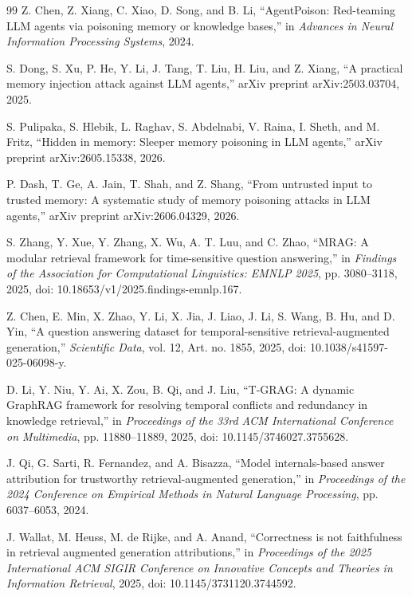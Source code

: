 \begin{thebibliography}{99}
Z. Chen, Z. Xiang, C. Xiao, D. Song, and B. Li, ``AgentPoison: Red-teaming LLM agents via poisoning memory or knowledge bases,'' in \emph{Advances in Neural Information Processing Systems}, 2024.

S. Dong, S. Xu, P. He, Y. Li, J. Tang, T. Liu, H. Liu, and Z. Xiang, ``A practical memory injection attack against LLM agents,'' arXiv preprint arXiv:2503.03704, 2025.

S. Pulipaka, S. Hlebik, L. Raghav, S. Abdelnabi, V. Raina, I. Sheth, and M. Fritz, ``Hidden in memory: Sleeper memory poisoning in LLM agents,'' arXiv preprint arXiv:2605.15338, 2026.

P. Dash, T. Ge, A. Jain, T. Shah, and Z. Shang, ``From untrusted input to trusted memory: A systematic study of memory poisoning attacks in LLM agents,'' arXiv preprint arXiv:2606.04329, 2026.

S. Zhang, Y. Xue, Y. Zhang, X. Wu, A. T. Luu, and C. Zhao, ``MRAG: A modular retrieval framework for time-sensitive question answering,'' in \emph{Findings of the Association for Computational Linguistics: EMNLP 2025}, pp. 3080--3118, 2025, doi: 10.18653/v1/2025.findings-emnlp.167.

Z. Chen, E. Min, X. Zhao, Y. Li, X. Jia, J. Liao, J. Li, S. Wang, B. Hu, and D. Yin, ``A question answering dataset for temporal-sensitive retrieval-augmented generation,'' \emph{Scientific Data}, vol. 12, Art. no. 1855, 2025, doi: 10.1038/s41597-025-06098-y.

D. Li, Y. Niu, Y. Ai, X. Zou, B. Qi, and J. Liu, ``T-GRAG: A dynamic GraphRAG framework for resolving temporal conflicts and redundancy in knowledge retrieval,'' in \emph{Proceedings of the 33rd ACM International Conference on Multimedia}, pp. 11880--11889, 2025, doi: 10.1145/3746027.3755628.

J. Qi, G. Sarti, R. Fernandez, and A. Bisazza, ``Model internals-based answer attribution for trustworthy retrieval-augmented generation,'' in \emph{Proceedings of the 2024 Conference on Empirical Methods in Natural Language Processing}, pp. 6037--6053, 2024.

J. Wallat, M. Heuss, M. de Rijke, and A. Anand, ``Correctness is not faithfulness in retrieval augmented generation attributions,'' in \emph{Proceedings of the 2025 International ACM SIGIR Conference on Innovative Concepts and Theories in Information Retrieval}, 2025, doi: 10.1145/3731120.3744592.


\end{thebibliography}
